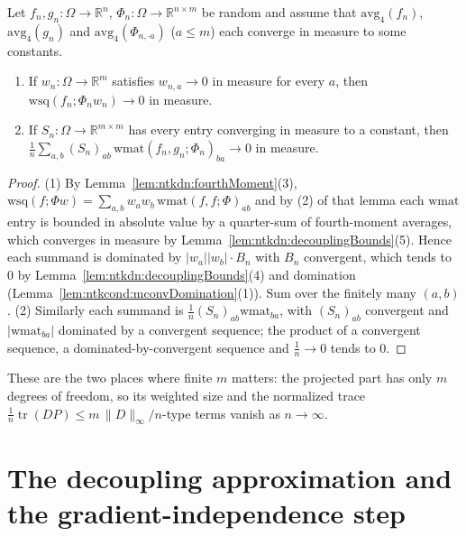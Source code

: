 \begin{theorem}\label{thm:ntkdn:projectedVanishes}
  \leanok
Let $f_n,g_n:\Omega\to\mathbb R^n$, $\Phi_n:\Omega\to\mathbb R^{n\times m}$ be random and assume that $\mathrm{avg}_4(f_n)$, $\mathrm{avg}_4(g_n)$ and $\mathrm{avg}_4(\Phi_{n,\cdot a})$ ($a\le m$) each converge in measure to some constants.
\begin{enumerate}
  \item If $w_n:\Omega\to\mathbb R^m$ satisfies $w_{n,a}\to0$ in measure for every $a$, then $\mathrm{wsq}(f_n;\Phi_nw_n)\to0$ in measure.
  \item If $S_n:\Omega\to\mathbb R^{m\times m}$ has every entry converging in measure to a constant, then $\tfrac1n\sum_{a,b}(S_n)_{ab}\,\mathrm{wmat}(f_n,g_n;\Phi_n)_{ba}\to0$ in measure.
\end{enumerate}
\end{theorem}

\begin{proof}
  \leanok
(1) By Lemma~\ref{lem:ntkdn:fourthMoment}(3), $\mathrm{wsq}(f;\Phi w)=\sum_{a,b}w_aw_b\,\mathrm{wmat}(f,f;\Phi)_{ab}$ and by (2) of that lemma each $\mathrm{wmat}$ entry is bounded in absolute value by a quarter-sum of fourth-moment averages, which converges in measure by Lemma~\ref{lem:ntkdn:decouplingBounds}(5). Hence each summand is dominated by $|w_a||w_b|\cdot B_n$ with $B_n$ convergent, which tends to $0$ by Lemma~\ref{lem:ntkdn:decouplingBounds}(4) and domination (Lemma~\ref{lem:ntkcond:mconvDomination}(1)). Sum over the finitely many $(a,b)$. (2) Similarly each summand is $\tfrac1n(S_n)_{ab}\mathrm{wmat}_{ba}$, with $(S_n)_{ab}$ convergent and $|\mathrm{wmat}_{ba}|$ dominated by a convergent sequence; the product of a convergent sequence, a dominated-by-convergent sequence and $\tfrac1n\to0$ tends to $0$.
\end{proof}

These are the two places where finite $m$ matters: the projected part has only $m$ degrees of freedom, so its weighted size and the normalized trace $\frac1n\operatorname{tr}(DP)\le m\,\|D\|_\infty/n$-type terms vanish as $n\to\infty$.


\section{The decoupling approximation and the gradient-independence step}\label{sec:ntkdn:decoupling}

